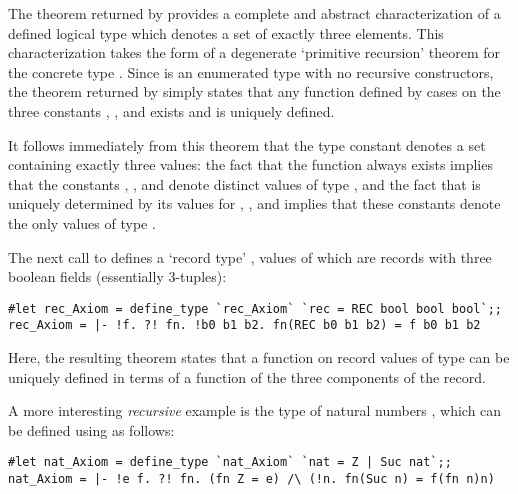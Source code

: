 {{\noindent The theorem returned by  provides a complete 
and abstract characterization of
a defined logical type  which denotes a set of
exactly three elements.  This characterization takes the form of a
degenerate `primitive recursion'
 theorem for the concrete type . 
Since  is an enumerated type with no recursive constructors, 
the theorem returned by  simply
states that any function defined by cases on the three constants  ,
, and  exists and is uniquely defined. 

It follows immediately from this theorem that the type constant 
denotes a set containing exactly three values: the fact that the function
 always exists implies that the constants , , and
 denote distinct values of type , and the fact that 
is uniquely determined by its values for , , and 
implies that these constants denote the only values of type .

The next call to  defines a `record type' , values of
which are records with three boolean fields (essentially 3-tuples):

\begin{session}\begin{verbatim}
#let rec_Axiom = define_type `rec_Axiom` `rec = REC bool bool bool`;;
rec_Axiom = |- !f. ?! fn. !b0 b1 b2. fn(REC b0 b1 b2) = f b0 b1 b2
\end{verbatim}\end{session}\label{rec-def}

\noindent Here, the resulting theorem states that a function  on
record values of type  can be
uniquely defined in terms of a function  of the three components of
the record.

A more interesting {\it recursive\/}
  example is the type of natural 
numbers
, which can be defined using  as follows:

\begin{session}\begin{verbatim}
#let nat_Axiom = define_type `nat_Axiom` `nat = Z | Suc nat`;;
nat_Axiom = |- !e f. ?! fn. (fn Z = e) /\ (!n. fn(Suc n) = f(fn n)n)
\end{verbatim}\end{session}

}}
